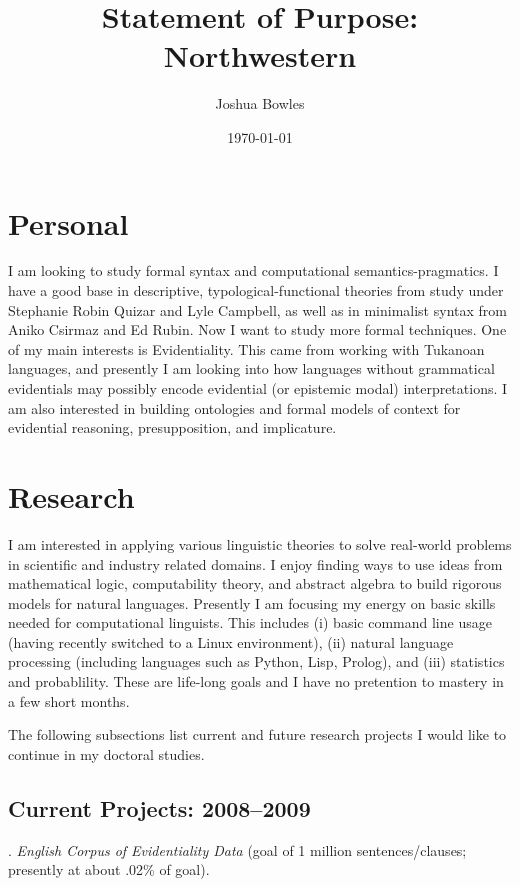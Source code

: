 \documentclass[11pt]{article}
\begin{document}
\author{Joshua Bowles}
\title{Statement of Purpose: Northwestern}
\date{\today}


\maketitle
\section{Personal}
I am looking to study formal syntax and computational semantics-pragmatics. I have a good base in descriptive, typological-functional theories from study under Stephanie Robin Quizar and Lyle Campbell, as well as in minimalist syntax from Aniko Csirmaz and Ed Rubin. Now I want to study more formal techniques. One of my main interests is Evidentiality. This came from working with Tukanoan languages, and presently I am looking into how languages without grammatical evidentials may possibly encode evidential (or epistemic modal) interpretations. I am also interested in building ontologies and formal models of context for evidential reasoning, presupposition, and implicature. 

\section{Research}
I am interested in applying various linguistic theories to solve real-world problems in scientific and industry related domains. I enjoy finding ways to use ideas from mathematical logic, computability theory, and abstract algebra to build rigorous models for natural languages. Presently I am focusing my energy on basic skills needed for computational linguists. This includes (i) basic command line usage (having recently switched to a Linux environment), (ii) natural language processing (including languages such as Python, Lisp, Prolog), and (iii) statistics and probablility. These are life-long goals and I have no pretention to mastery in a few short months.   

The following subsections list current and future research projects I would like to continue in my doctoral studies. 

\subsection{Current Projects: 2008--2009}
\ex. \textsl{English Corpus of Evidentiality Data} (goal of 1 million sentences/clauses; presently at about .02\% of goal).
\end{document}
